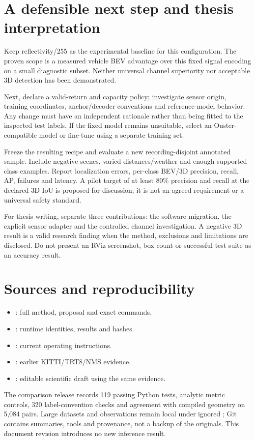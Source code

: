 \documentclass[11pt,a4paper]{article}
\begin{document}
\section{A defensible next step and thesis interpretation}
Keep reflectivity/255 as the experimental baseline for this configuration.
The proven scope is a measured vehicle BEV advantage over this fixed signal
encoding on a small diagnostic subset. Neither universal channel superiority nor
acceptable 3D detection has been demonstrated.

Next, declare a valid-return and capacity policy; investigate sensor origin,
training coordinates, anchor/decoder conventions and reference-model behavior.
Any change must have an independent rationale rather than being fitted to the
inspected test labels. If the fixed model remains unsuitable, select an
Ouster-compatible model or fine-tune using a separate training set.

Freeze the resulting recipe and evaluate a new recording-disjoint annotated
sample. Include negative scenes, varied distances/weather and enough supported
class examples. Report localization errors, per-class BEV/3D precision, recall,
AP, failures and latency. A pilot target of at least 80\% precision and recall
at the declared 3D IoU is proposed for discussion; it is not an agreed requirement
or a universal safety standard.

For thesis writing, separate three contributions: the software migration,
the explicit sensor adapter and the controlled channel investigation. A negative
3D result is a valid research finding when the method, exclusions and limitations
are disclosed. Do not present an RViz screenshot, box count or successful test
suite as an accuracy result.

\section{Sources and reproducibility}
\begin{itemize}
\item {}: full method, proposal and exact commands.
\item {}: runtime identities, results and hashes.
\item {}: current operating instructions.
\item {}: earlier KITTI/TRT8/NMS evidence.
\item {}: editable scientific draft using the same evidence.
\end{itemize}
The comparison release records 119 passing Python tests, analytic metric controls,
320 label-convention checks and agreement with compiled geometry on 5,084 pairs.
Large datasets and observations remain local under ignored ;
Git contains summaries, tools and provenance, not a backup of the originals.
This document revision introduces no new inference result.
\end{document}
